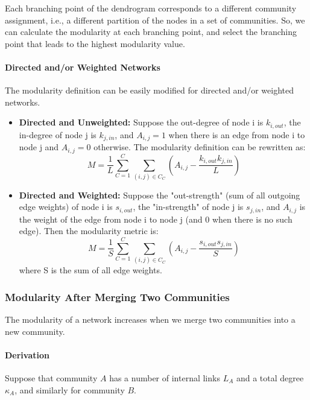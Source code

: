 \documentclass[11pt]{scrartcl} %
\begin{document}
Each branching point of the dendrogram corresponds to a different community assignment, i.e., a different partition of the nodes in a set of communities. So, we can calculate the modularity at each branching point, and select the branching point that leads to the highest modularity value.  
 
\paragraph{Directed and/or Weighted Networks} 
The modularity definition can be easily modified for directed and/or weighted networks.

\begin{itemize}
	\item \textbf{Directed and Unweighted:} Suppose the out-degree of node i is $k_{i,out}$, the in-degree of node j is $k_{j,in}$, and $A_{i,j}=1$ when there is an edge from node i to node j and  $A_{i,j}=0$ otherwise. The modularity definition can be rewritten as:
\[ M = \frac{1}{L} \sum_{C=1}^{C} \sum_{(i,j)\in C_C} \left(A_{i,j} - \frac{k_{i,out} k_{j,in}}{L}\right) \]
	\item \textbf{Directed and Weighted:} Suppose the "out-strength" (sum of all outgoing edge weights) of node i is $s_{i,out}$, the "in-strength" of node j is $s_{j,in}$, and $A_{i,j}$ is the weight of the edge from node i to node j (and 0 when there is no such edge). Then the modularity metric is:
\[ M = \frac{1}{S} \sum_{C=1}^{C} \sum_{(i,j)\in C_C} \left(A_{i,j} - \frac{s_{i,out} s_{j,in}}{S}\right) \] 
where S is the sum of all edge weights.
\end{itemize}

\subsubsection{Modularity After Merging Two Communities}
The modularity of a network increases when we merge two communities into a new community.

\paragraph{Derivation} Suppose that community $A$ has a number of internal links $L_A$ and a total degree $\kappa_A$, and similarly for community $B$. 
\end{document}
